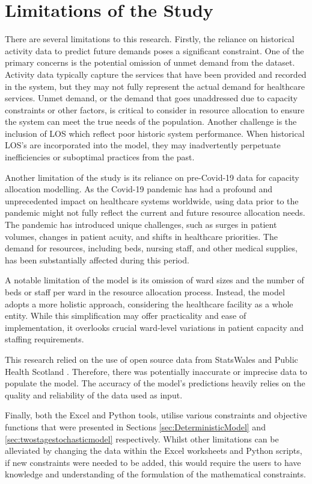 \documentclass[../thesis.tex]{subfiles}
\begin{document}
\section{Limitations of the Study}
There are several limitations to this research. Firstly, the reliance on historical activity data to predict future demands poses a significant constraint. One of the primary concerns is the potential omission of unmet demand from the dataset. Activity data typically capture the services that have been provided and recorded in the system, but they may not fully represent the actual demand for healthcare services. Unmet demand, or the demand that goes unaddressed due to capacity constraints or other factors, is critical to consider in resource allocation to ensure the system can meet the true needs of the population. Another challenge is the inclusion of LOS which reflect poor historic system performance. When historical LOS's are incorporated into the model, they may inadvertently perpetuate inefficiencies or suboptimal practices from the past.

Another limitation of the study is its reliance on pre-Covid-19 data for capacity allocation modelling. As the Covid-19 pandemic has had a profound and unprecedented impact on healthcare systems worldwide, using data prior to the pandemic might not fully reflect the current and future resource allocation needs. The pandemic has introduced unique challenges, such as surges in patient volumes, changes in patient acuity, and shifts in healthcare priorities. The demand for resources, including beds, nursing staff, and other medical supplies, has been substantially affected during this period.

A notable limitation of the model is its omission of ward sizes and the number of beds or staff per ward in the resource allocation process. Instead, the model adopts a more holistic approach, considering the healthcare facility as a whole entity. While this simplification may offer practicality and ease of implementation, it overlooks crucial ward-level variations in patient capacity and staffing requirements.

This research relied on the use of open source data from StatsWales \cite{StatsWalespp1} and Public Health Scotland \cite{PHS2021}. Therefore, there was potentially inaccurate or imprecise data to populate the model. The accuracy of the model's predictions heavily relies on the quality and reliability of the data used as input.

Finally, both the Excel and Python tools, utilise various constraints and objective functions that were presented in Sections \ref{sec:DeterministicModel} and \ref{sec:twostagestochasticmodel} respectively. Whilst other limitations can be alleviated by changing the data within the Excel worksheets and Python scripts, if new constraints were needed to be added, this would require the users to have knowledge and understanding of the formulation of the mathematical constraints.
\end{document}
